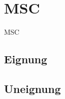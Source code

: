\section{MSC}
\label{sc:MSCB}
\ac{MSC} 
\subsection{Eignung}
\label{sc:MSCEignung}

\subsection{Uneignung}
\label{sc:MSCUnEignung}